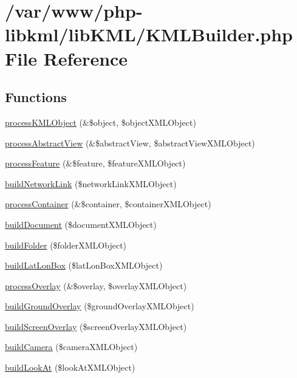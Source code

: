 \hypertarget{KMLBuilder_8php}{
\section{/var/www/php-\/libkml/libKML/KMLBuilder.php File Reference}
\label{d0/d8f/KMLBuilder_8php}
}
\subsection*{Functions}
\begin{DoxyCompactItemize}
\item 
\hyperlink{KMLBuilder_8php_a0256544cbc073f3cd8a93aef85161eb5}{processKMLObject} (\&\$object, \$objectXMLObject)
\item 
\hyperlink{KMLBuilder_8php_aa9d306924ba35066b0882ccc17c65c71}{processAbstractView} (\&\$abstractView, \$abstractViewXMLObject)
\item 
\hyperlink{KMLBuilder_8php_ae177a8d59669e02ef9fa93c1bdce288d}{processFeature} (\&\$feature, \$featureXMLObject)
\item 
\hyperlink{KMLBuilder_8php_a6bac6f014734e124c8d48980ba67010b}{buildNetworkLink} (\$networkLinkXMLObject)
\item 
\hyperlink{KMLBuilder_8php_af8a31532ccfc360813b5f8b06713e6ce}{processContainer} (\&\$container, \$containerXMLObject)
\item 
\hyperlink{KMLBuilder_8php_aa460d63083eebfd63587bc6dd128270f}{buildDocument} (\$documentXMLObject)
\item 
\hyperlink{KMLBuilder_8php_aaeee6983b03015828d4631e9217a888a}{buildFolder} (\$folderXMLObject)
\item 
\hyperlink{KMLBuilder_8php_a73b1b166750bc1c054726817c4cec4ba}{buildLatLonBox} (\$latLonBoxXMLObject)
\item 
\hyperlink{KMLBuilder_8php_a337a64adfb97e97db2626fe0cf4dfc69}{processOverlay} (\&\$overlay, \$overlayXMLObject)
\item 
\hyperlink{KMLBuilder_8php_a6cb1074cf70b2634abcf4b9cb2730164}{buildGroundOverlay} (\$groundOverlayXMLObject)
\item 
\hyperlink{KMLBuilder_8php_aab63b8a09437339f58583979e4585016}{buildScreenOverlay} (\$screenOverlayXMLObject)
\item 
\hyperlink{KMLBuilder_8php_afe6f6edf2be5a89f9605022b58980caa}{buildCamera} (\$cameraXMLObject)
\item 
\hyperlink{KMLBuilder_8php_ad1e7aa071568a005d678fd39f01e9aab}{buildLookAt} (\$lookAtXMLObject)

\end{DoxyCompactItemize}
